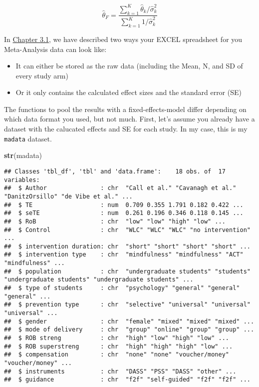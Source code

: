\documentclass[]{book}
\newenvironment{Shaded}{\begin{snugshade}}{\end{snugshade}}
\newcommand{\KeywordTok}[1]{\textcolor[rgb]{0.13,0.29,0.53}{\textbf{#1}}}
\newcommand{\NormalTok}[1]{#1}
\providecommand{\tightlist}{%
  \setlength{\itemsep}{0pt}\setlength{\parskip}{0pt}}
\theoremstyle{definition}
\theoremstyle{definition}
\theoremstyle{definition}
\theoremstyle{remark}
\begin{document}
\begin{equation}
\hat\theta_F = \frac{\sum\limits_{k=1}^K \hat\theta_k/ \hat\sigma^2_k}{\sum\limits_{k=1}^K 1/\hat\sigma^2_k}
\end{equation}

In \protect\hyperlink{excel_preparation}{Chapter 3.1}, we have described
two ways your EXCEL spreadsheet for you Meta-Analysis data can look
like:

\begin{itemize}
\tightlist
\item
  It can either be stored as the raw data (including the Mean, N, and SD
  of every study arm)
\item
  Or it only contains the calculated effect sizes and the standard error
  (SE)
\end{itemize}

The functions to pool the results with a fixed-effects-model differ
depending on which data format you used, but not much. First, let's
assume you already have a dataset with the calucated effects and SE for
each study. In my case, this is my \texttt{madata} dataset.

\begin{Shaded}
\begin{Highlighting}[]
\KeywordTok{str}\NormalTok{(madata)}
\end{Highlighting}
\end{Shaded}

\begin{verbatim}
## Classes 'tbl_df', 'tbl' and 'data.frame':    18 obs. of  17 variables:
##  $ Author               : chr  "Call et al." "Cavanagh et al." "DanitzOrsillo" "de Vibe et al." ...
##  $ TE                   : num  0.709 0.355 1.791 0.182 0.422 ...
##  $ seTE                 : num  0.261 0.196 0.346 0.118 0.145 ...
##  $ RoB                  : chr  "low" "low" "high" "low" ...
##  $ Control              : chr  "WLC" "WLC" "WLC" "no intervention" ...
##  $ intervention duration: chr  "short" "short" "short" "short" ...
##  $ intervention type    : chr  "mindfulness" "mindfulness" "ACT" "mindfulness" ...
##  $ population           : chr  "undergraduate students" "students" "undergraduate students" "undergraduate students" ...
##  $ type of students     : chr  "psychology" "general" "general" "general" ...
##  $ prevention type      : chr  "selective" "universal" "universal" "universal" ...
##  $ gender               : chr  "female" "mixed" "mixed" "mixed" ...
##  $ mode of delivery     : chr  "group" "online" "group" "group" ...
##  $ ROB streng           : chr  "high" "low" "high" "low" ...
##  $ ROB superstreng      : chr  "high" "high" "high" "low" ...
##  $ compensation         : chr  "none" "none" "voucher/money" "voucher/money" ...
##  $ instruments          : chr  "DASS" "PSS" "DASS" "other" ...
##  $ guidance             : chr  "f2f" "self-guided" "f2f" "f2f" ...
\end{verbatim}
\end{document}

